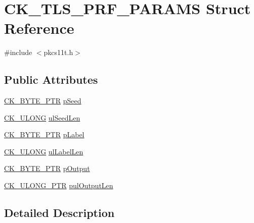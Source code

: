 \hypertarget{struct_c_k___t_l_s___p_r_f___p_a_r_a_m_s}{}\section{C\+K\+\_\+\+T\+L\+S\+\_\+\+P\+R\+F\+\_\+\+P\+A\+R\+A\+MS Struct Reference}
\label{struct_c_k___t_l_s___p_r_f___p_a_r_a_m_s}


{\ttfamily \#include $<$pkcs11t.\+h$>$}

\subsection*{Public Attributes}
\begin{DoxyCompactItemize}
\item 
\hyperlink{pkcs11t_8h_a3d7233a4077fbaf7ae76b64da0a62a21}{C\+K\+\_\+\+B\+Y\+T\+E\+\_\+\+P\+TR} \hyperlink{struct_c_k___t_l_s___p_r_f___p_a_r_a_m_s_aa012b8b8d63420d7f362aea1fa01ab8e}{p\+Seed}
\item 
\hyperlink{pkcs11t_8h_a35181858a3b7a0a81f49d180d8f446ef}{C\+K\+\_\+\+U\+L\+O\+NG} \hyperlink{struct_c_k___t_l_s___p_r_f___p_a_r_a_m_s_aae15be52f15063f44a1aaa60dd342171}{ul\+Seed\+Len}
\item 
\hyperlink{pkcs11t_8h_a3d7233a4077fbaf7ae76b64da0a62a21}{C\+K\+\_\+\+B\+Y\+T\+E\+\_\+\+P\+TR} \hyperlink{struct_c_k___t_l_s___p_r_f___p_a_r_a_m_s_ad2cc7fd882acaa3a6bdb6154de8a111f}{p\+Label}
\item 
\hyperlink{pkcs11t_8h_a35181858a3b7a0a81f49d180d8f446ef}{C\+K\+\_\+\+U\+L\+O\+NG} \hyperlink{struct_c_k___t_l_s___p_r_f___p_a_r_a_m_s_ab34e2fdf546644631b1d029ba636c5cd}{ul\+Label\+Len}
\item 
\hyperlink{pkcs11t_8h_a3d7233a4077fbaf7ae76b64da0a62a21}{C\+K\+\_\+\+B\+Y\+T\+E\+\_\+\+P\+TR} \hyperlink{struct_c_k___t_l_s___p_r_f___p_a_r_a_m_s_a2149f3e8e3b28dc29ed3c7a1a3d9696c}{p\+Output}
\item 
\hyperlink{pkcs11t_8h_af18ced3aa6adcd9f76ae8c132ed2eeb9}{C\+K\+\_\+\+U\+L\+O\+N\+G\+\_\+\+P\+TR} \hyperlink{struct_c_k___t_l_s___p_r_f___p_a_r_a_m_s_ac52ea2c9eac0b87c96eba125e814058b}{pul\+Output\+Len}
\end{DoxyCompactItemize}


\subsection{Detailed Description}


